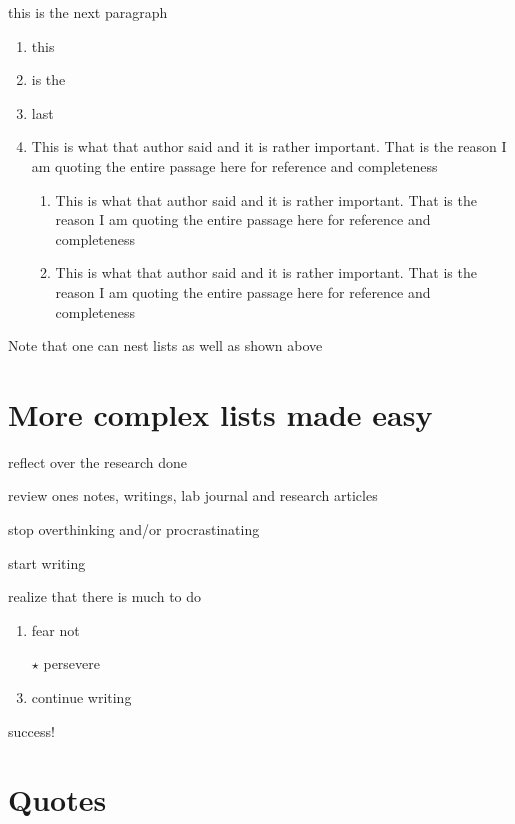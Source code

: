 this is the next paragraph

\begin{enumerate}[A\}]
    \item this
    \item is the
    \item last
    \item This is what that author said and it is rather important. That is the
    reason I am quoting the entire passage here for reference and completeness
    \begin{enumerate}
        \item This is what that author said and it is rather important. That is
the reason I am quoting the entire passage here for reference and completeness
        \item  This is what that author said and it is rather important. That is
the reason I am quoting the entire passage here for reference and completeness
    \end{enumerate}
\end{enumerate}

Note that one can nest lists as well as shown above

\section{More complex lists made easy}
\begin{enumerate}[{Step rsc{]}}, leftmargin=2cm]
    \item reflect over the research done
    \item review ones notes, writings, lab journal and research articles
    \item stop overthinking and/or procrastinating
    \item start writing
    \item realize that there is much to do
    \begin{enumerate}[{i\}}]
        \item fear not
        \item[$\star$] persevere
        \item continue writing
    \end{enumerate}
    \item success!
\end{enumerate}


\section{Quotes}

